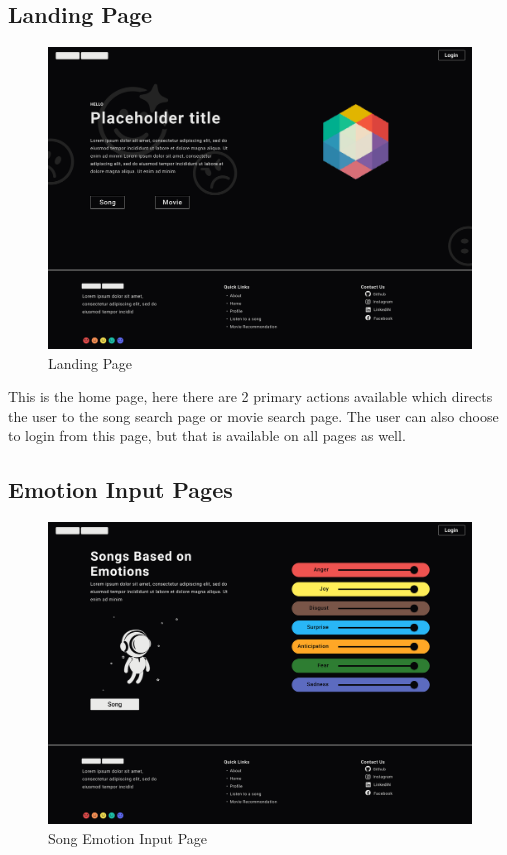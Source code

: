 \subsection{Landing Page}
\begin{figure}[H]
\centering
\includegraphics[width=\textwidth]{imgs/ui1.png}
\caption{Landing Page}
\label{fig: ui1}
\end{figure}

This is the home page, here there are 2 primary actions available which directs the user to the song search page or movie search page. The user can also choose to login from this page, but that is available on all pages as well.


\subsection{Emotion Input Pages}
\begin{figure}[H]
\centering
\includegraphics[width=\textwidth]{imgs/ui2.png}
\caption{Song Emotion Input Page}
\label{fig: ui2}
\end{figure}

